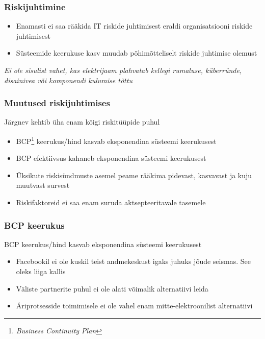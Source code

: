 \begin{frame}[fragile]
  \frametitle{Riskijuhtimine}
	
	\begin{itemize}
		\item Enamasti ei saa rääkida IT riskide juhtimisest eraldi organisatsiooni riskide juhtimisest
		\item Süsteemide keerukuse kasv muudab põhimõtteliselt riskide juhtimise olemust
	\end{itemize}

	\begin{center}
		\emph{Ei ole sisulist vahet, kas elektrijaam plahvatab kellegi rumaluse, küberründe, disainivea või komponendi kulumise tõttu}
	\end{center}
\end{frame}

\begin{frame}[fragile]
  \frametitle{Muutused riskijuhtimises}
	Järgnev kehtib üha enam kõigi riskitüüpide puhul
	\begin{itemize}
		\item BCP\footnote{\emph{Business Continuity Plan}} keerukus/hind kasvab eksponendina süsteemi keerukusest
		\item BCP efektiivsus kahaneb eksponendina süsteemi keerukusest
		\item Üksikute riskisündmuste asemel peame rääkima pidevast, kasvavast ja kuju muutvast survest
		\item Riskifaktoreid ei saa enam suruda aktsepteeritavale tasemele
	\end{itemize}
\end{frame}

\iffalse
\begin{frame}[fragile]
  \frametitle{BCP keerukus}
	BCP keerukus/hind kasvab eksponendina süsteemi keerukusest
	\begin{itemize}
		\item Facebookil ei ole kuskil teist andmekeskust igaks juhuks jõude seismas. See oleks liiga kallis
		\item Väliste partnerite puhul ei ole alati võimalik alternatiivi leida
		\item Äriprotsesside toimimisele ei ole vahel enam mitte-elektroonilist alternatiivi
	\end{itemize}
\end{frame}

